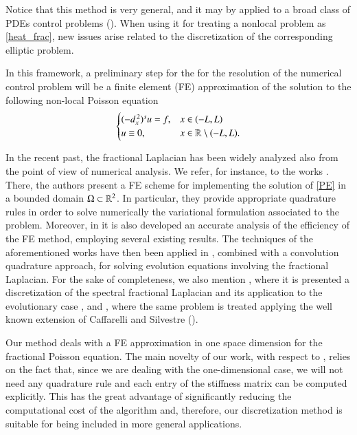 Notice that this method is very general, and it may by applied to a broad class of PDEs control problems (\cite{boyer2013penalised,boyer2017insensitizing,boyer2014approximate,khodja2017partial}). When using it for treating a nonlocal problem as \eqref{heat_frac}, new issues arise related to the discretization of the corresponding elliptic problem.    

In this framework, a preliminary step for the for the resolution of the numerical control problem will be a finite element (FE)  approximation of the solution to the following non-local Poisson equation
\begin{align}\label{PE}
	\begin{cases}
		(-d_x^{\,2})^{s}u = f, & x\in(-L,L)
		\\
		u\equiv 0, & x\in\mathbb{R}\setminus(-L,L).
	\end{cases}
\end{align}

In the recent past, the fractional Laplacian has been widely analyzed also from the point of view of numerical analysis. We refer, for instance, to the works \cite{acosta2017short,acosta2017fractional,borthagaray2017laplaciano}. There, the authors present a FE scheme for implementing the solution of \eqref{PE} in a bounded domain $\Omega\subset\mathbb{R}^2$. In particular, they provide appropriate quadrature rules in order to solve numerically the variational formulation associated to the problem. Moreover, in \cite{acosta2017fractional,borthagaray2017laplaciano} it is also developed an accurate analysis of the efficiency of the FE method, employing several existing results. The techniques of the aforementioned works have then been applied in \cite{acosta2017finite}, combined with a convolution quadrature approach, for solving evolution equations involving the fractional Laplacian. For the sake of completeness, we also mention \cite{bonito2015numerical}, where it is presented a discretization of the spectral fractional Laplacian and its application to the evolutionary case \cite{bonito2017approximation}, and \cite{nochetto2015pde}, where the same problem is treated applying the well known extension of Caffarelli and Silvestre (\cite{caffarelli2007extension}).   

Our method deals with a FE approximation in one space dimension for the fractional Poisson equation. The main novelty of our work, with respect to \cite{acosta2017short,acosta2017fractional,borthagaray2017laplaciano}, relies on the fact that, since we are dealing with the one-dimensional case, we will not need any quadrature rule and each entry of the stiffness matrix can be computed explicitly. This has the great advantage of significantly reducing the computational cost of the algorithm and, therefore, our discretization method is suitable for being included in more general applications.  


